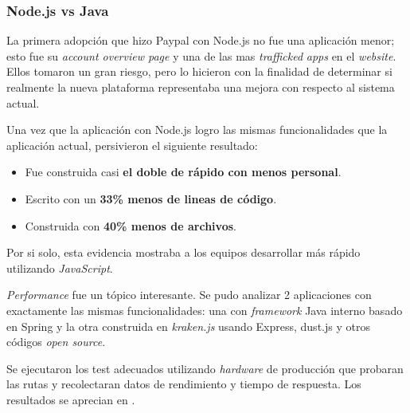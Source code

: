 \subsubsection{Node.js vs Java \cite{online_nodejs_paypal}}



La primera adopción que hizo Paypal con Node.js no fue una aplicación menor; esto fue su \textit{account overview page} y una de las mas \textit{trafficked} \textit{apps} en el \textit{website}. Ellos tomaron un gran riesgo, pero lo hicieron con la finalidad de determinar si realmente la nueva plataforma representaba una mejora con respecto al sistema actual.

Una vez que la aplicación con Node.js logro las mismas funcionalidades que la aplicación actual, persivieron el siguiente resultado:

\begin{itemize}
\item Fue construida casi \textbf{el doble de rápido con menos personal}.
\item Escrito con un \textbf{33\% menos de lineas de código}.
\item Construida con \textbf{40\% menos de archivos}.
\end{itemize}

Por si solo, esta evidencia mostraba a los equipos desarrollar más rápido utilizando \textit{JavaScript}.

\textit{Performance} fue un tópico interesante. Se pudo analizar 2 aplicaciones con exactamente las mismas funcionalidades: una con \textit{framework} Java interno basado en Spring y la otra construida en \textit{kraken.js} usando Express, dust.js y otros códigos \textit{open source}.

Se ejecutaron los test adecuados utilizando \textit{hardware} de producción que probaran las rutas y recolectaran datos de rendimiento y tiempo de respuesta. Los resultados se aprecian en .

